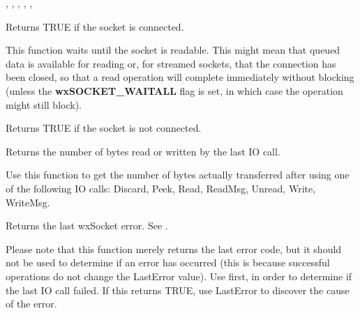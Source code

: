 , 
, 
, 
, 
, 

%
%
\label{wxsocketbaseisconnected}


Returns TRUE if the socket is connected.

%
%
\label{wxsocketbaseisdata}


This function waits until the socket is readable. This might mean that
queued data is available for reading or, for streamed sockets, that
the connection has been closed, so that a read operation will complete
immediately without blocking (unless the {\bf wxSOCKET\_WAITALL} flag
is set, in which case the operation might still block).

\label{wxsocketbaseisdisconnected}

%
%

Returns TRUE if the socket is not connected.

\label{wxsocketbaselastcount}

%
%

Returns the number of bytes read or written by the last IO call.

Use this function to get the number of bytes actually transferred
after using one of the following IO calls: Discard, Peek, Read,
ReadMsg, Unread, Write, WriteMsg.

%
%
\label{wxsocketbaselasterror}


Returns the last wxSocket error. See .

Please note that this function merely returns the last error code,
but it should not be used to determine if an error has occurred (this
is because successful operations do not change the LastError value).
Use  first, in order to determine
if the last IO call failed. If this returns TRUE, use LastError
to discover the cause of the error.

